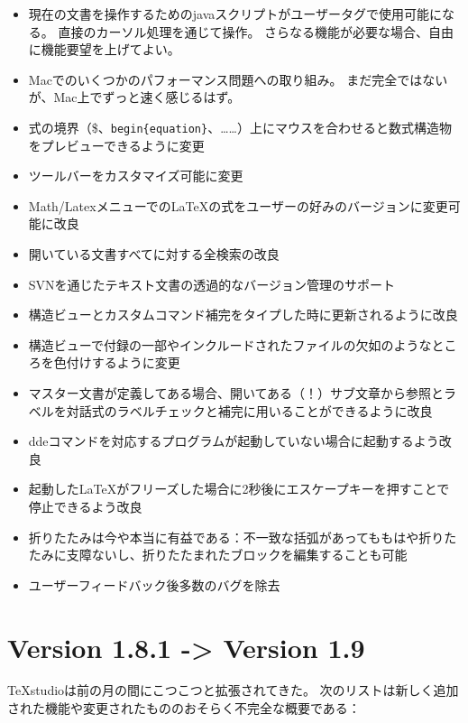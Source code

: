 \begin{itemize}
\item
  現在の文書を操作するためのjavaスクリプトがユーザータグで使用可能になる。
  直接のカーソル処理を通じて操作。
  さらなる機能が必要な場合、自由に機能要望を上げてよい。
\item
  Macでのいくつかのパフォーマンス問題への取り組み。
  まだ完全ではないが、Mac上でずっと速く感じるはず。
\item
  式の境界（\$、\verb+begin{equation}+、……）上にマウスを合わせると数式構造物をプレビューできるように変更
\item
  ツールバーをカスタマイズ可能に変更
\item
  Math/LatexメニューでのLaTeXの式をユーザーの好みのバージョンに変更可能に改良
\item
  開いている文書すべてに対する全検索の改良
\item
  SVNを通じたテキスト文書の透過的なバージョン管理のサポート
\item
  構造ビューとカスタムコマンド補完をタイプした時に更新されるように改良
\item
  構造ビューで付録の一部やインクルードされたファイルの欠如のようなところを色付けするように変更
\item
  マスター文書が定義してある場合、開いてある（！）サブ文章から参照とラベルを対話式のラベルチェックと補完に用いることができるように改良
\item
  ddeコマンドを対応するプログラムが起動していない場合に起動するよう改良
\item
  起動したLaTeXがフリーズした場合に2秒後にエスケープキーを押すことで停止できるよう改良
\item
  折りたたみは今や本当に有益である：不一致な括弧があってももはや折りたたみに支障ないし、折りたたまれたブロックを編集することも可能
\item
  ユーザーフィードバック後多数のバグを除去
\end{itemize}

\section{Version 1.8.1 -\textgreater{} Version 1.9}

TeXstudioは前の月の間にこつこつと拡張されてきた。
次のリストは新しく追加された機能や変更されたもののおそらく不完全な概要である：

